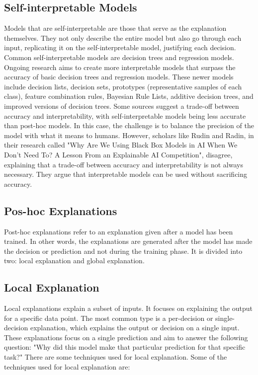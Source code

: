 \documentclass[10pt,journal,compsoc]{IEEEtran}
\begin{document}
\subsection{Self-interpretable Models}
Models that are self-interpretable are those that serve as the explanation themselves. They not only describe the entire model but also go through each input, replicating it on the self-interpretable model, justifying each decision.
Common self-interpretable models are decision trees and regression models. Ongoing research aims to create more interpretable models that surpass the accuracy of basic decision trees and regression models. These newer models include decision lists, decision sets, prototypes (representative samples of each class), feature combination rules, Bayesian Rule Lists, additive decision trees, and improved versions of decision trees.\cite{phillips2020four}
Some sources suggest a trade-off between accuracy and interpretability, with self-interpretable models being less accurate than post-hoc models. In this case, the challenge is to balance the precision of the model with what it means to humans. However, scholars like Rudin\cite{rudin} and Radin\cite{radin}, in their research called "Why Are We Using Black Box Models in AI When We Don’t Need To? A Lesson From an Explainable AI Competition", disagree, 
explaining that a trade-off between accuracy and interpretability is not always necessary. They argue that interpretable models can be used without sacrificing accuracy. \cite{phillips2020four}

\subsection{Pos-hoc Explanations}
Post-hoc explanations refer to an explanation given after a model has been trained. In other words, the explanations are generated after the model has made the decision or prediction and not during the training phase. It is divided into two: local explanation and global explanation.

\subsection{Local Explanation} Local explanations explain a subset of inputs. It focuses on explaining the output for a specific data point. The most common type is a per-decision or single-decision explanation, which explains the output or decision on a single input.\cite{phillips2020four}
These explanations focus on a single prediction and aim to answer the following question: "Why did this model make that particular prediction for that specific task?" There are some techniques used for local explanation. Some of the techniques used for local explanation are:
\end{document}
